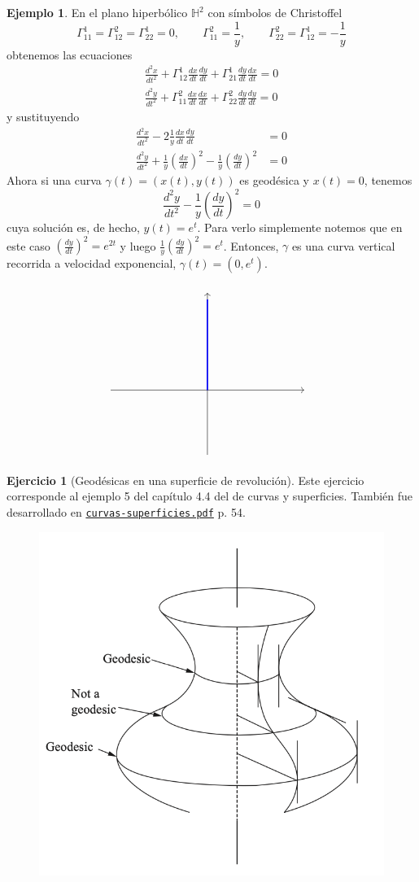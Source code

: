 \documentclass[spanish]{book}
\theoremstyle{definition}
\newtheorem*{ejer*}{Ejercicio}
\newtheorem*{ejem}{Ejemplo}
\newcommand{\Hy}{\mathbb{H}}
\begin{document}
	\begin{ejem}
		En el plano hiperbólico $\Hy^2$ con símbolos de Christoffel
		\[\Gamma^1_{11}=\Gamma^2_{12}=\Gamma^1_{22}=0,\qquad \Gamma_{11}^2=\frac{1}{y},\qquad \Gamma_{22}^2=\Gamma^1_{12}=-\frac{1}{y}\]
		obtenemos las ecuaciones
		\begin{align*}
			\frac{d^2x}{dt^2}+\Gamma_{12}^1\frac{dx}{dt}\frac{dy}{dt}+\Gamma^1_{21}\frac{dy}{dt}\frac{dx}{dt}=0\\
			\frac{d^2y}{dt^2}+\Gamma_{11}^2\frac{dx}{dt}\frac{dx}{dt}+\Gamma^2_{22}\frac{dy}{dt}\frac{dy}{dt}=0
		\end{align*}
		y sustituyendo
		\begin{align*}
			\frac{d^2x}{dt^2}-2\frac{1}{y}\frac{dx}{dt}\frac{dy}{dt}&=0\\
			\frac{d^2y}{dt^2}+\frac{1}{y}\left(\frac{dx}{dt}\right)^2-\frac{1}{y}\left(\frac{dy}{dt}\right)^2&=0
		\end{align*}
		Ahora si una curva $\gamma(t)=(x(t),y(t))$ es geodésica y $x(t)=0$, tenemos 
		\[\frac{d^2y}{dt^2}-\frac{1}{y}\left(\frac{dy}{dt}\right)^2=0\]
		cuya solución es, de hecho, $y(t)=e^t$. Para verlo simplemente notemos que en este caso $\left(\frac{dy}{dt}\right)^2=e^{2t}$ y luego $\frac{1}{y}\left(\frac{dy}{dt}\right)^2=e^t$. Entonces, $\gamma$ es una curva vertical recorrida a velocidad exponencial, $\gamma(t)=(0,e^t)$.
		
		\[\begin{tikzpicture}
			\draw[->] (-3,0) -- (3,0) node[right] {};
			\draw[->] (0,-2) -- (0,3) node[above] {};
			
			\draw[blue, very thick, domain=0:2.8] plot (0,\x);
		\end{tikzpicture}\]
	\end{ejem}
	
	\begin{ejer*}[Geodésicas en una superficie de revolución] Este ejercicio corresponde al ejemplo 5 del capítulo 4.4 del \cite{DoCarmo-sup} de curvas y superficies. También fue desarrollado en \href{https://github.com/dan-gc/curvas-superficies/blob/main/curvas-superficies.pdf}{\texttt{curvas-superficies.pdf}} p. 54. %
		\begin{figure}[H]
			\begin{center}
				\centering
				\includegraphics[width=0.5\linewidth]{fig17}
			\end{center}
		\end{figure}
	\end{ejer*}	
	
\end{document}
